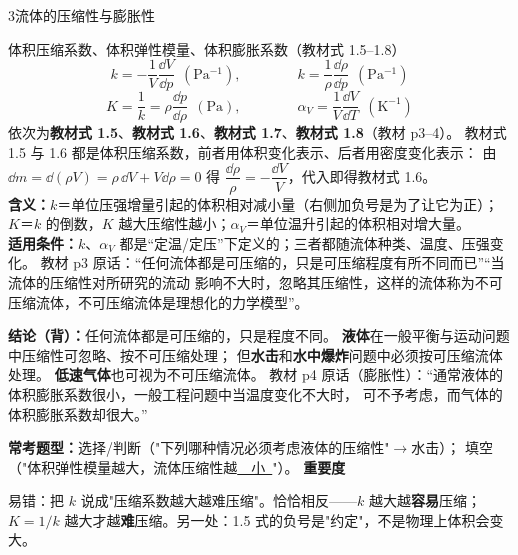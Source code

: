 \begin{kaodian}{3}{流体的压缩性与膨胀性}
\begin{gongshi}{体积压缩系数、体积弹性模量、体积膨胀系数（教材式 1.5--1.8）}
\[ k=-\frac{1}{V}\frac{\dd V}{\dd p}\ \ (\mathrm{Pa^{-1}}),\qquad\qquad
   k=\frac{1}{\rho}\frac{\dd\rho}{\dd p}\ \ (\mathrm{Pa^{-1}}) \]
\[ K=\frac{1}{k}=\rho\frac{\dd p}{\dd\rho}\ \ (\mathrm{Pa}),\qquad\qquad
   \alpha_V=\frac{1}{V}\frac{\dd V}{\dd T}\ \ (\mathrm{K^{-1}}) \]
\noindent 依次为\textbf{教材式 1.5}、\textbf{教材式 1.6}、\textbf{教材式 1.7}、\textbf{教材式 1.8}（教材 p3--4）。
教材式 1.5 与 1.6 都是体积压缩系数，前者用体积变化表示、后者用密度变化表示：
由 $\dd m=\dd(\rho V)=\rho\,\dd V+V\dd\rho=0$ 得 $\dfrac{\dd\rho}{\rho}=-\dfrac{\dd V}{V}$，代入即得教材式 1.6。\\
\textbf{含义：}$k$＝单位压强增量引起的体积相对减小量（右侧加负号是为了让它为正）；
$K$＝$k$ 的倒数，$K$ 越大压缩性越小；$\alpha_V$＝单位温升引起的体积相对增大量。\\
\textbf{适用条件：}$k$、$\alpha_V$ 都是“定温/定压”下定义的；三者都随流体种类、温度、压强变化。
教材 p3 原话：“任何流体都是可压缩的，只是可压缩程度有所不同而已”“当流体的压缩性对所研究的流动
影响不大时，忽略其压缩性，这样的流体称为不可压缩流体，不可压缩流体是理想化的力学模型”。
\end{gongshi}

\textbf{结论（背）：}任何流体都是可压缩的，只是程度不同。
\textbf{液体}在一般平衡与运动问题中压缩性可忽略、按不可压缩处理；
但\textbf{水击}和\textbf{水中爆炸}问题中必须按可压缩流体处理。
\textbf{低速气体}也可视为不可压缩流体。
教材 p4 原话（膨胀性）：“通常液体的体积膨胀系数很小，一般工程问题中当温度变化不大时，
可不予考虑，而气体的体积膨胀系数却很大。”

\textbf{常考题型：}选择/判断（"下列哪种情况必须考虑液体的压缩性"$\to$水击）；
填空（"体积弹性模量越大，流体压缩性越\underline{\ \ 小\ }"）。
\textbf{重要度 }\quad{}\quad{}

\begin{yicuo}
易错：把 $k$ 说成"压缩系数越大越难压缩"。恰恰相反——$k$ 越大越\textbf{容易}压缩；
$K=1/k$ 越大才越\textbf{难}压缩。另一处：1.5 式的负号是"约定"，不是物理上体积会变大。
\end{yicuo}
\end{kaodian}

